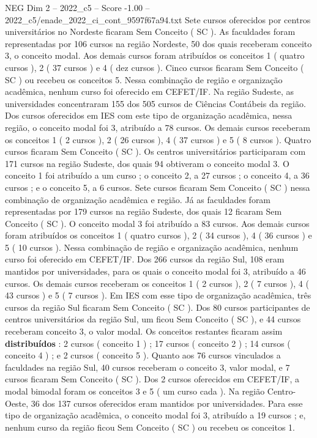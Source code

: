 \begin{textsample}{NEG Dim 2 – 2022\_c5 – Score -1.00 – 2022\_c5/enade\_2022\_ci\_cont\_9597f67a94.txt}
Sete cursos oferecidos por centros universitários no Nordeste ficaram Sem Conceito ( SC ).
As faculdades foram representadas por 106 cursos na região Nordeste, 50 dos quais receberam conceito 3, o conceito modal.
Aos demais cursos foram atribuídos os conceitos 1 ( quatro cursos ), 2 ( 37 cursos ) e 4 ( dez cursos ).
Cinco cursos ficaram Sem Conceito ( SC ) ou recebeu os conceitos 5.
Nessa combinação de região e organização acadêmica, nenhum curso foi oferecido em CEFET/IF.
Na região Sudeste, as universidades concentraram 155 dos 505 cursos de Ciências Contábeis da região.
Dos cursos oferecidos em IES com este tipo de organização acadêmica, nessa região, o conceito modal foi 3, atribuído a 78 cursos.
Os demais cursos receberam os conceitos 1 ( 2 cursos ), 2 ( 26 cursos ), 4 ( 37 cursos ) e 5 ( 8 cursos ).
Quatro cursos ficaram Sem Conceito ( SC ).
Os centros universitários participaram com 171 cursos na região Sudeste, dos quais 94 obtiveram o conceito modal 3.
O conceito 1 foi atribuído a um curso ; o conceito 2, a 27 cursos ; o conceito 4, a 36 cursos ; e o conceito 5, a 6 cursos.
Sete cursos ficaram Sem Conceito ( SC ) nessa combinação de organização acadêmica e região.
Já as faculdades foram representadas por 179 cursos na região Sudeste, dos quais 12 ficaram Sem Conceito ( SC ).
O conceito modal 3 foi atribuído a 83 cursos.
Aos demais cursos foram atribuídos os conceitos 1 ( quatro cursos ), 2 ( 34 cursos ), 4 ( 36 cursos ) e 5 ( 10 cursos ).
Nessa combinação de região e organização acadêmica, nenhum curso foi oferecido em CEFET/IF.
Dos 266 cursos da região Sul, 108 eram mantidos por universidades, para os quais o conceito modal foi 3, atribuído a 46 cursos.
Os demais cursos receberam os conceitos 1 ( 2 cursos ), 2 ( 7 cursos ), 4 ( 43 cursos ) e 5 ( 7 cursos ).
Em IES com esse tipo de organização acadêmica, três cursos da região Sul ficaram Sem Conceito ( SC ).
Dos 80 cursos participantes de centros universitários da região Sul, um ficou Sem Conceito ( SC ), e 44 cursos receberam conceito 3, o valor modal.
Os conceitos restantes ficaram assim \textbf{distribuídos} : 2 cursos ( conceito 1 ) ; 17 cursos ( conceito 2 ) ; 14 cursos ( conceito 4 ) ; e 2 cursos ( conceito 5 ).
Quanto aos 76 cursos vinculados a faculdades na região Sul, 40 cursos receberam o conceito 3, valor modal, e 7 cursos ficaram Sem Conceito ( SC ).
Dos 2 cursos oferecidos em CEFET/IF, a modal bimodal foram os conceitos 3 e 5 ( um curso cada ).
Na região Centro-Oeste, 36 dos 137 cursos oferecidos eram mantidos por universidades.
Para esse tipo de organização acadêmica, o conceito modal foi 3, atribuído a 19 cursos ; e, nenhum curso da região ficou Sem Conceito ( SC ) ou recebeu os conceitos 1.

\end{textsample}

